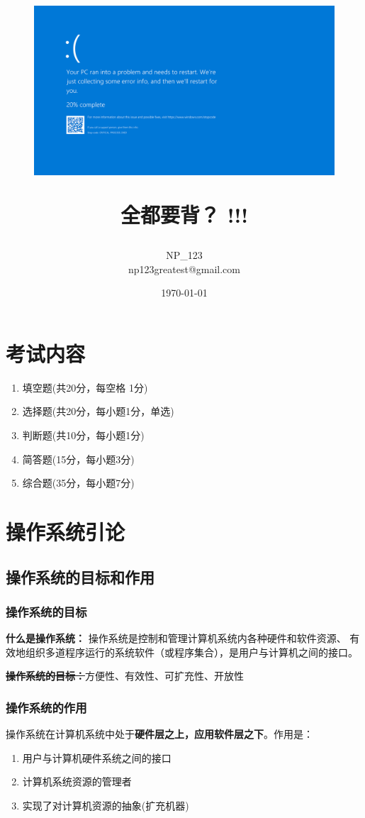 \documentclass{article}
\title{
    \begin{figure}[h]
        \centering
        \includegraphics[width=\textwidth]{1.png}
      \end{figure}    
      \vspace*{-5.4cm}
      \textbf{
\huge 全都要背？ \hspace*{5pt} !!!}}
\author{NP\_123\\np123greatest@gmail.com}
\date{\today }
\begin{document}
 


\maketitle
\tableofcontents


\section*{考试内容}
\begin{enumerate}
    \item 填空题(共20分，每空格 1分)
    \item 选择题(共20分，每小题1分，单选)
    \item 判断题(共10分，每小题1分)
    \item 简答题(15分，每小题3分)
    \item 综合题(35分，每小题7分)
\end{enumerate}
\clearpage

\section{操作系统引论}

\subsection{操作系统的目标和作用}
\subsubsection{\color{red}操作系统的目标}
\textbf{什么是操作系统：}
操作系统是控制和管理计算机系统内各种硬件和软件资源、
有效地组织多道程序运行的系统软件（或程序集合），是用户与计算机之间的接口。

\textbf{\sout{操作系统的目标：}}{\color{gray}方便性、有效性、可扩充性、开放性}
\subsubsection{{\color{red}操作系统的作用}}
\noindent 操作系统在计算机系统中处于\textbf{硬件层之上，应用软件层之下}。作用是：
\begin{enumerate}
    \item 用户与计算机硬件系统之间的接口
    \item 计算机系统资源的管理者
    \item 实现了对计算机资源的抽象(扩充机器)
\end{enumerate}
\end{document}
